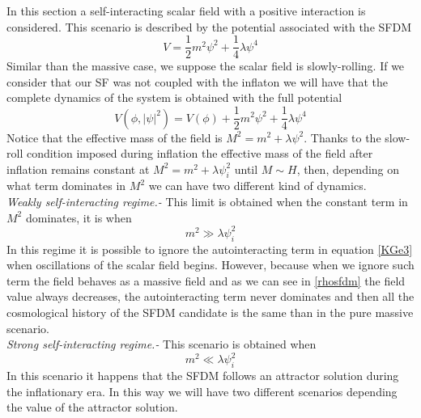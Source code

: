 \documentclass[amssymb,twocolumn,prd,nofootinbib,showpacs]{revtex4-1}
\begin{document}
In this section a self-interacting scalar field with a positive interaction is considered. This scenario is described by the potential associated with the SFDM
\begin{equation}
V = \frac{1}{2}m^2\psi^2+\frac{1}{4}\lambda \psi^4
\end{equation}
Similar than the massive case, we suppose the scalar field is slowly-rolling. If we consider that our SF was not coupled with the inflaton we will have that the complete dynamics of the system is obtained with the full potential 
\begin{equation}
V(\phi,|\psi|^2)=V(\phi)+\frac{1}{2}m^2\psi^2+\frac{1}{4}\lambda\psi^4
\end{equation}
Notice that the effective mass of the field is $M^2=m^2+\lambda\psi^2$. Thanks to the slow-roll condition imposed during inflation the effective mass of the field after inflation remains constant at $M^2=m^2+\lambda\psi_i^2$ until $M\sim H$, then, depending on what term dominates in $M^2$ we can have two different kind of dynamics. 
\\

\textit{Weakly self-interacting regime.-} This limit is obtained when the constant term in $M^2$ dominates, it is when
\begin{equation}\label{consw}
m^2\gg \lambda\psi_i^2
\end{equation}
In this regime it is possible to ignore the autointeracting term in equation \eqref{KGe3} when oscillations of the scalar field begins. However, because when we ignore such term the field behaves as a massive field and as we can see in \eqref{rhosfdm} the field value always decreases, the autointeracting term never dominates and then all the cosmological history of the SFDM candidate is the same than in the pure massive scenario. 
\\

\textit{Strong self-interacting regime.-} This scenario is obtained when 
\begin{equation}
m^2\ll \lambda\psi_i^2
\end{equation}
In this scenario it happens that the SFDM follows an attractor solution during the inflationary era. In this way we will have two different scenarios depending the value of the attractor solution.
\\
\end{document}
